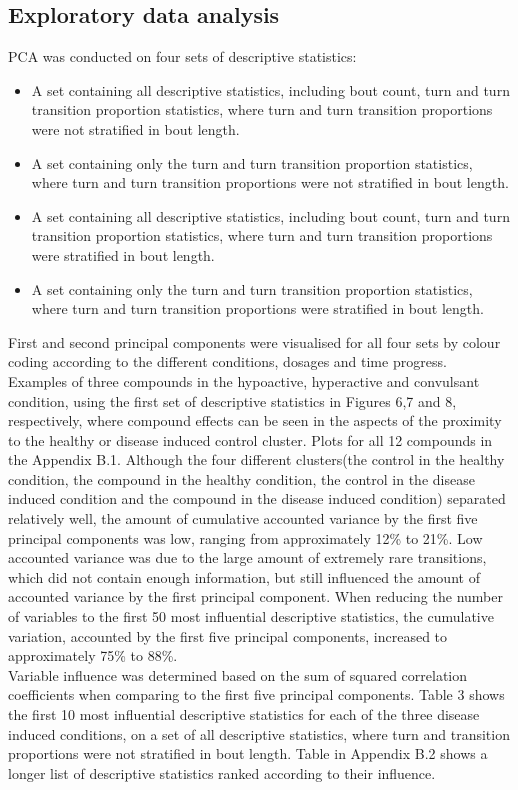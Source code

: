 \documentclass[a4paper,12pt]{article}
\begin{document}
\subsection{Exploratory data analysis}
PCA was conducted on four sets of descriptive statistics:
\begin{itemize}
\item A set containing all descriptive statistics, including bout count, turn and turn transition proportion statistics, where turn and turn transition proportions were not stratified in bout length.
\item A set containing only the turn and turn transition proportion statistics, where turn and turn transition proportions were not stratified in bout length.
\item A set containing all descriptive statistics, including bout count, turn and turn transition proportion statistics, where turn and turn transition proportions were stratified in bout length. 
\item A set containing only the turn and turn transition proportion statistics, where turn and turn transition proportions were stratified in bout length.
\end{itemize}
First and second principal components were visualised for all four sets by colour coding according to the different conditions, dosages and time progress. \\Examples of three compounds in the hypoactive, hyperactive and convulsant condition, using the first set of descriptive statistics in Figures 6,7 and 8, respectively, where compound effects can be seen in the aspects of the proximity to the healthy or disease induced control cluster. Plots for all 12 compounds in the Appendix B.1. Although the four different clusters(the control in the healthy condition, the compound in the healthy condition, the control in the disease induced condition and the compound in the disease induced condition) separated relatively well, the amount of cumulative accounted variance by the first five principal components was low, ranging from approximately 12\% to 21\%. Low accounted variance was due to the large amount of extremely rare transitions, which did not contain enough information, but still influenced the amount of accounted variance by the first principal component. When reducing the number of variables to the first 50 most influential descriptive statistics, the cumulative variation, accounted by the first five principal components, increased to approximately 75\% to 88\%.
\\Variable influence was determined based on the sum of squared correlation coefficients when comparing to the first five principal components. Table 3 shows the first 10 most influential descriptive statistics for each of the three disease induced conditions, on a set of all descriptive statistics, where turn and transition proportions were not stratified in bout length. Table in Appendix B.2 shows a longer list of descriptive statistics ranked according to their influence. 
\end{document}
